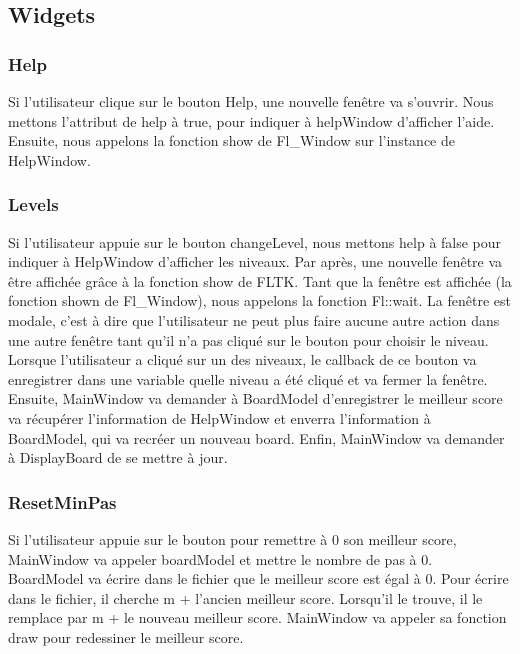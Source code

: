 \documentclass[utf8]{article}
\begin{document}
\begin{large}
\subsection{Widgets}
\subsubsection{Help}
\indent
\par
Si l'utilisateur clique sur le bouton Help, une nouvelle fenêtre va s'ouvrir.
Nous mettons l'attribut de help à true, pour indiquer à helpWindow d'afficher
l'aide. Ensuite, nous appelons la fonction show de Fl\_Window sur l'instance de
HelpWindow.
\par
\subsubsection{Levels}
\indent
\par
Si l'utilisateur appuie sur le bouton changeLevel, nous mettons help à false
pour indiquer à HelpWindow d'afficher les niveaux. Par après, une nouvelle
fenêtre va être affichée grâce à la fonction show de FLTK. Tant que la fenêtre
est affichée (la fonction shown de Fl\_Window), nous appelons la fonction
Fl::wait. La fenêtre est modale, c'est à dire que l'utilisateur ne peut plus
faire aucune autre action dans une autre fenêtre tant qu'il n'a pas cliqué sur
le bouton pour choisir le niveau. Lorsque l'utilisateur a cliqué sur un des
niveaux, le callback de ce bouton va enregistrer dans une variable quelle niveau
a été cliqué et va fermer la fenêtre. Ensuite, MainWindow va demander à
BoardModel d'enregistrer le meilleur score va récupérer l'information de
HelpWindow et enverra l'information à BoardModel, qui va recréer un nouveau
board. Enfin, MainWindow va demander à DisplayBoard de se mettre à jour.

\par

\subsubsection{ResetMinPas}
\indent
\par
Si l'utilisateur appuie sur le bouton pour remettre à 0 son meilleur score,
MainWindow va appeler boardModel et mettre le nombre de pas à 0. BoardModel va
écrire dans le fichier que le meilleur score est égal à 0. Pour écrire dans le
fichier, il cherche m + l'ancien meilleur score. Lorsqu'il le trouve, il le
remplace par m + le nouveau meilleur score. MainWindow va appeler sa fonction
draw pour redessiner le meilleur score.
\par


\end{large}
\end{document}

